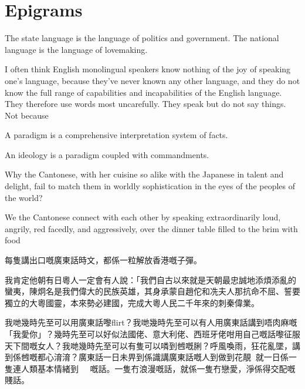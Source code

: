 


\chapter{Epigrams}
The state language is the language of politics and government. The national language is the language of lovemaking.

\separator

I often think English monolingual speakers know nothing of the joy of speaking one’s language, because they’ve never known any other language, and they do not know the full range of capabilities and incapabilities of the English language. They therefore use words most uncarefully. They speak but do not say things. Not because

\separator

A paradigm is a comprehensive interpretation system of facts.

An ideology is a paradigm coupled with commandments.

\separator


Why the Cantonese, with her cuisine so alike with the Japanese in talent and delight, fail to match them in worldly sophistication in the eyes of the peoples of the world?

\separator

We the Cantonese connect with each other by speaking extraordinarily loud, angrily, red facedly, and aggressively, over the dinner table filled to the brim with food


\separator

每隻講出口嘅廣東話時文，都係一粒解放香港嘅子彈。

\separator

我肯定他朝有日粵人一定會有人說：「我們自古以來就是天朝最忠誠地添煩添亂的蠻夷，陳炯名是我們偉大的民族英雄，其身承蒙自趙佗和冼夫人那抗命不屈、誓要獨立的大粵國靈，本來勢必建國，完成大粵人民二千年來的刺秦偉業。

\separator

我哋幾時先至可以用廣東話嚟flirt？我哋幾時先至可以有人用廣東話講到唔肉麻嘅「我愛你」？幾時先至可以好似法國佬、意大利佬、西班牙佬咁用自己嘅話嚟征服天下間嘅女人？我哋幾時先至可以有隻可以噒到乸嘅脷？呼風喚雨，狂花亂墜，講到係乸嘅都心淯淯？廣東話一日未畀到係識講廣東話嘅人到做到花靚，就一日係一隻連人類基本情緒到𠄡嘅話。一隻冇浪漫嘅話，就係一隻冇戀愛，淨係得交配嘅賤話。

\separator 




